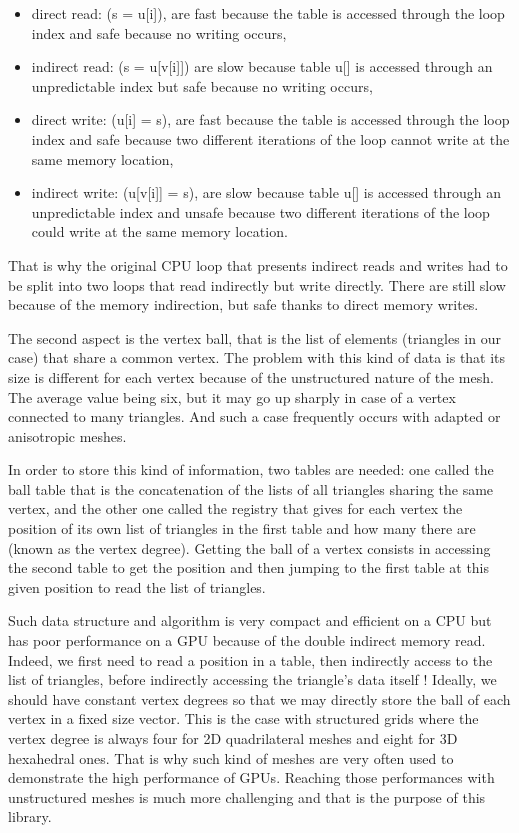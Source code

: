 \documentclass[a4paper,12pt]{article}
\begin{document}
\begin{itemize}
\item direct read: (s = u[i]), are fast because the table is accessed through the loop index and safe because no writing occurs,
\item indirect read: (s = u[v[i]]) are slow because table u[] is accessed through an unpredictable index but safe because no writing occurs,
\item direct write: (u[i] = s), are fast because the table is accessed through the loop index and safe because two different iterations of the loop cannot write at the same memory location,
\item indirect write: (u[v[i]] = s), are slow because table u[] is accessed through an unpredictable index and unsafe because two different iterations of the loop could write at the same memory location.
\end{itemize}

That is why the original CPU loop that presents indirect reads and writes had to be split into two loops that read indirectly but write directly. There are still slow because of the memory indirection, but safe thanks to direct memory writes.

The second aspect is the vertex ball, that is the list of elements (triangles in our case) that share a common vertex. The problem with this kind of data is that its size is different for each vertex because of the unstructured nature of the mesh. The average value being six, but it may go up sharply in case of a vertex connected to many triangles. 
And such a case frequently occurs with adapted or anisotropic meshes.

In order to store this kind of information, two tables are needed: one called the ball table that is the concatenation of the lists of all triangles sharing the same vertex, and the other one called the registry that gives for each vertex the position of its own list of triangles in the first table and how many there are (known as the vertex degree). Getting the ball of a vertex consists in accessing the second table to get the position and then jumping to the first table at this given position to read the list of triangles.

Such data structure and algorithm is very compact and efficient on a CPU but has poor performance on a GPU because of the double indirect memory read. Indeed, we first need to read a position in a table, then indirectly access to the list of triangles, before indirectly accessing the triangle's data itself ! Ideally, we should have constant vertex degrees so that we may directly store the ball of each vertex in a fixed size vector. This is the case with structured grids where the vertex degree is always four for 2D quadrilateral meshes and eight for 3D hexahedral ones. That is why such kind of meshes are very often used to demonstrate the high performance of GPUs. Reaching those performances with unstructured meshes is much more challenging and that is the purpose of this library.
\end{document}
